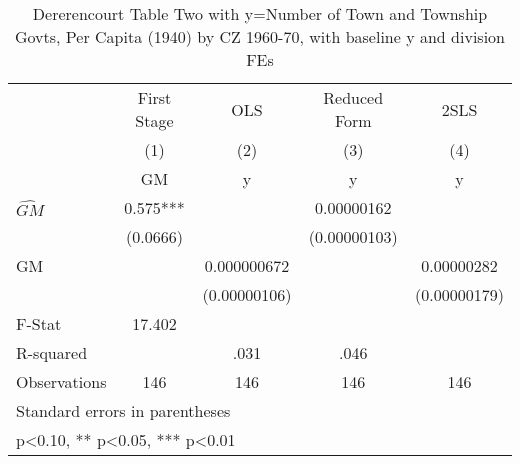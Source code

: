 \begin{table}[htbp]\centering
\def\sym#1{\ifmmode^{#1}\else\(^{#1}\)\fi}
\caption{Dererencourt Table Two with y=Number of Town and Township Govts, Per Capita (1940) by CZ 1960-70, with baseline y and division FEs}
\begin{tabular}{l*{4}{c}}
\toprule
                    & First Stage   &         OLS   &Reduced Form   &        2SLS   \\
                    &\multicolumn{1}{c}{(1)}&\multicolumn{1}{c}{(2)}&\multicolumn{1}{c}{(3)}&\multicolumn{1}{c}{(4)}\\
                    &\multicolumn{1}{c}{GM}&\multicolumn{1}{c}{y}&\multicolumn{1}{c}{y}&\multicolumn{1}{c}{y}\\
\midrule
$\hat{GM}$          &       0.575***&               &  0.00000162   &               \\
                    &    (0.0666)   &               &(0.00000103)   &               \\
\addlinespace
GM                  &               & 0.000000672   &               &  0.00000282   \\
                    &               &(0.00000106)   &               &(0.00000179)   \\
\midrule
F-Stat              &      17.402   &               &               &               \\
R-squared           &               &        .031   &        .046   &               \\
Observations        &         146   &         146   &         146   &         146   \\
\bottomrule
\multicolumn{5}{l}{\footnotesize Standard errors in parentheses}\\
\multicolumn{5}{l}{\footnotesize * p<0.10, ** p<0.05, *** p<0.01}\\
\end{tabular}
\end{table}
